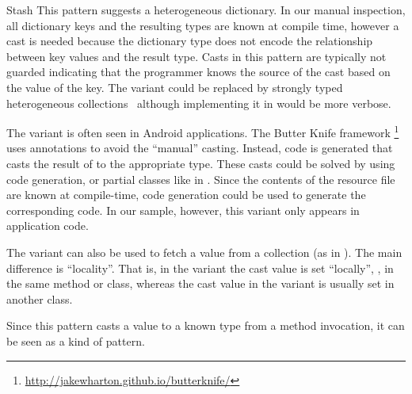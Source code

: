 \begin{pattern}{Stash}
\issues{}
This pattern suggests a heterogeneous dictionary.
In our manual inspection,
all dictionary keys and the resulting types are known at compile time,
however a cast is needed because the dictionary type does not encode the
relationship between key values and the result type.
Casts in this pattern are typically not guarded indicating that the programmer knows the source of the cast based on the value of the key.
The  variant could be replaced by 
strongly typed heterogeneous collections~\citep{kiselyovStronglyTypedHeterogeneous2004} although implementing it in \java{} would be more verbose.

The  variant is often seen in Android applications.
The Butter Knife framework%
\footnote{\url{http://jakewharton.github.io/butterknife/}}
uses annotations to avoid the ``manual'' casting.
Instead, code is generated that casts the result of  to the appropriate type.
These casts could be solved by using code generation,
or partial classes like in \csharp{}.
Since the contents of the resource file are known at compile-time,
code generation could be used to generate the corresponding \java{} code.
In our sample, however, this variant only appears in application code.

The  variant can also be used to fetch a value from a collection
(as in ).
The main difference is ``locality''.
That is, in the  variant the cast value is set ``locally'', \ie{},
in the same method or class,
whereas the cast value in the  variant is usually set in another class.

Since this pattern casts a value to a known type from a method invocation,
it can be seen as a kind of  pattern.

\end{pattern}
